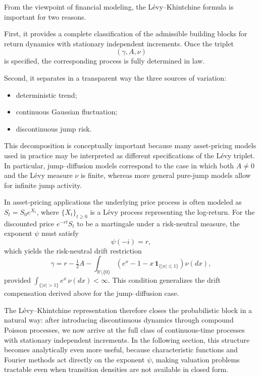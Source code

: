 From the viewpoint of financial modeling, the L\'evy--Khintchine formula is important for two reasons.

First, it provides a complete classification of the admissible building blocks for return dynamics with stationary independent increments. Once the triplet
\[
(\gamma,A,\nu)
\]
is specified, the corresponding process is fully determined in law.

Second, it separates in a transparent way the three sources of variation:
\begin{itemize}[label = --]
    \item deterministic trend;
    \item continuous Gaussian fluctuation;
    \item discontinuous jump risk.
\end{itemize}

This decomposition is conceptually important because many asset-pricing models used in practice may be interpreted as different specifications of the L\'evy triplet. In particular, jump--diffusion models correspond to the case in which both $A\neq 0$ and the L\'evy measure $\nu$ is finite, whereas more general pure-jump models allow for infinite jump activity.

\begin{remark}\label{rem:levy-drift}
In asset-pricing applications the underlying price process is often modeled as $S_t = S_0 e^{X_t}$, where $\{X_t\}_{t\geq 0}$ is a L\'evy process representing the log-return. For the discounted price $e^{-rt}S_t$ to be a martingale under a risk-neutral measure, the exponent $\psi$ must satisfy
\[
\psi(-i) = r,
\]
which yields the risk-neutral drift restriction
\[
\gamma = r - \tfrac{1}{2}A - \int_{\mathbb{R}\setminus\{0\}}\left(e^x - 1 - x\,\mathbf{1}_{\{|x|\leq 1\}}\right)\nu(dx),
\]
provided $\int_{\{|x|>1\}} e^x\,\nu(dx)<\infty$. This condition generalizes the drift compensation derived above for the jump--diffusion case.
\end{remark}

The L\'evy--Khintchine representation therefore closes the probabilistic block in a natural way: after introducing discontinuous dynamics through compound Poisson processes, we now arrive at the full class of continuous-time processes with stationary independent increments. In the following section, this structure becomes analytically even more useful, because characteristic functions and Fourier methods act directly on the exponent $\psi$, making valuation problems tractable even when transition densities are not available in closed form.

